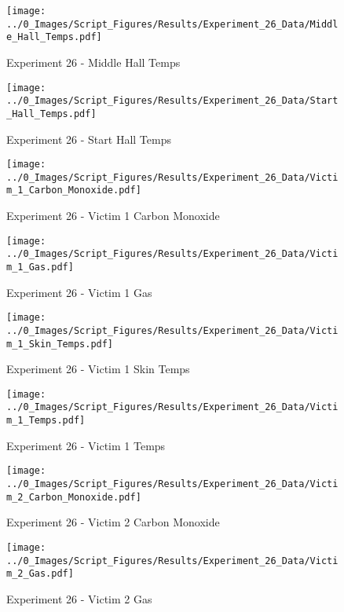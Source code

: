 	\clearpage

	\begin{figure}[H]
		\centering
		\texttt{[image: ../0\_Images/Script\_Figures/Results/Experiment\_26\_Data/Middle\_Hall\_Temps.pdf]}
		\caption[]{Experiment 26 - Middle Hall Temps}
	\end{figure}
 

	\begin{figure}[H]
		\centering
		\texttt{[image: ../0\_Images/Script\_Figures/Results/Experiment\_26\_Data/Start\_Hall\_Temps.pdf]}
		\caption[]{Experiment 26 - Start Hall Temps}
	\end{figure}
 
	\clearpage

	\begin{figure}[H]
		\centering
		\texttt{[image: ../0\_Images/Script\_Figures/Results/Experiment\_26\_Data/Victim\_1\_Carbon\_Monoxide.pdf]}
		\caption[]{Experiment 26 - Victim 1 Carbon Monoxide}
	\end{figure}
 

	\begin{figure}[H]
		\centering
		\texttt{[image: ../0\_Images/Script\_Figures/Results/Experiment\_26\_Data/Victim\_1\_Gas.pdf]}
		\caption[]{Experiment 26 - Victim 1 Gas}
	\end{figure}
 
	\clearpage

	\begin{figure}[H]
		\centering
		\texttt{[image: ../0\_Images/Script\_Figures/Results/Experiment\_26\_Data/Victim\_1\_Skin\_Temps.pdf]}
		\caption[]{Experiment 26 - Victim 1 Skin Temps}
	\end{figure}
 

	\begin{figure}[H]
		\centering
		\texttt{[image: ../0\_Images/Script\_Figures/Results/Experiment\_26\_Data/Victim\_1\_Temps.pdf]}
		\caption[]{Experiment 26 - Victim 1 Temps}
	\end{figure}
 
	\clearpage

	\begin{figure}[H]
		\centering
		\texttt{[image: ../0\_Images/Script\_Figures/Results/Experiment\_26\_Data/Victim\_2\_Carbon\_Monoxide.pdf]}
		\caption[]{Experiment 26 - Victim 2 Carbon Monoxide}
	\end{figure}
 

	\begin{figure}[H]
		\centering
		\texttt{[image: ../0\_Images/Script\_Figures/Results/Experiment\_26\_Data/Victim\_2\_Gas.pdf]}
		\caption[]{Experiment 26 - Victim 2 Gas}
	\end{figure}
 
